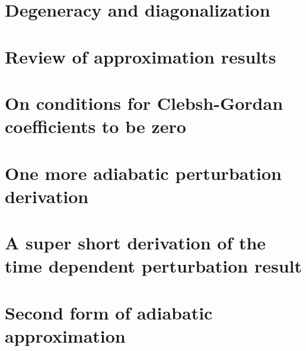    \chapter{Degeneracy and diagonalization}
      
   \chapter{Review of approximation results}
      
   \chapter{On conditions for Clebsh-Gordan coefficients to be zero}
      
   \chapter{One more adiabatic perturbation derivation}
      
   \chapter{A super short derivation of the time dependent perturbation result}
      
   \chapter{Second form of adiabatic approximation}
      
